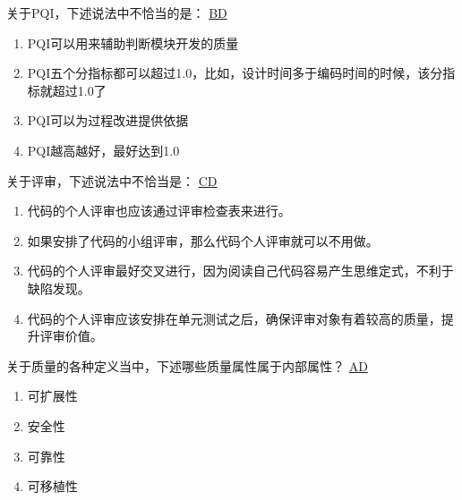 \begin{problem}
    关于PQI，下述说法中不恰当的是：
	\uline{BD}    
        \begin{enumerate}[label=\Alph*.]
            \item PQI可以用来辅助判断模块开发的质量
            \item PQI五个分指标都可以超过1.0，比如，设计时间多于编码时间的时候，该分指标就超过1.0了
            \item PQI可以为过程改进提供依据
            \item PQI越高越好，最好达到1.0
        \end{enumerate}
\end{problem}



\begin{problem}
	关于评审，下述说法中不恰当是：
	\uline{CD}    
        \begin{enumerate}[label=\Alph*.]
            \item 代码的个人评审也应该通过评审检查表来进行。
            \item 如果安排了代码的小组评审，那么代码个人评审就可以不用做。
            \item 代码的个人评审最好交叉进行，因为阅读自己代码容易产生思维定式，不利于缺陷发现。
            \item 代码的个人评审应该安排在单元测试之后，确保评审对象有着较高的质量，提升评审价值。
        \end{enumerate}
\end{problem}



\begin{problem}
	关于质量的各种定义当中，下述哪些质量属性属于内部属性？
	\uline{AD}    
    \vspace{-0.8em}
    \begin{multicols}{4}
        \begin{enumerate}[label=\Alph*.]
            \item 可扩展性
            \item 安全性
            \item 可靠性
            \item 可移植性
        \end{enumerate}
    \end{multicols}
    \vspace{-1em}
\end{problem}



